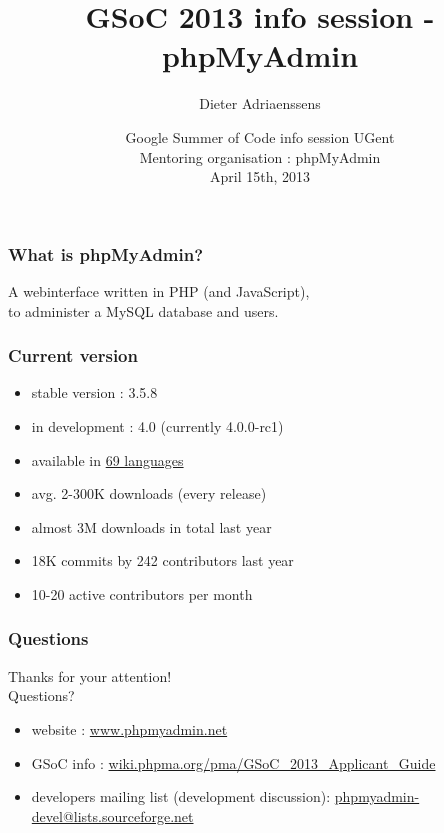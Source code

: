 \documentclass[14pt]{beamer}
\title{GSoC 2013 info session - phpMyAdmin}
\author{Dieter Adriaenssens}
\institute[phpMyAdmin]{phpMyAdmin developer}
\date[15Apr2013]{Google Summer of Code info session UGent\\
Mentoring organisation : phpMyAdmin\\
April 15th, 2013}
\begin{document}
  \begin{frame}
  \titlepage
  \end{frame}
  \begin{frame}
    \frametitle{What is phpMyAdmin?}
      A webinterface written in PHP (and JavaScript),\\
      to administer a MySQL database and users.
  \end{frame}
  \begin{frame}
    \frametitle{Current version}
    \begin{itemize}
      \item stable version : 3.5.8
      \item in development : 4.0 (currently 4.0.0-rc1)
      \item available in \href{http://www.phpmyadmin.net/home\_page/translations.php}{69 languages}
      \item avg. 2-300K downloads (every release)
      \item almost 3M downloads in total last year
      \item 18K commits by 242 contributors last year
      \item 10-20 active contributors per month
    \end{itemize}
  \end{frame}
  \begin{frame}
   \frametitle{Questions}
    Thanks for your attention!\\
    Questions?
    \begin{itemize}
      \item website : \href{http://www.phpmyadmin.net/}{www.phpmyadmin.net}
      \item GSoC info : \href{http://wiki.phpma.org/pma/GSoC\_2013\_Applicant\_Guide}{wiki.phpma.org/pma/GSoC\_2013\_Applicant\_Guide}
      \item developers mailing list (development discussion): \href{mailto:phpmyadmin-devel@lists.sourceforge.net}{phpmyadmin-devel@lists.sourceforge.net}
    \end{itemize}
  \end{frame}
\end{document}
